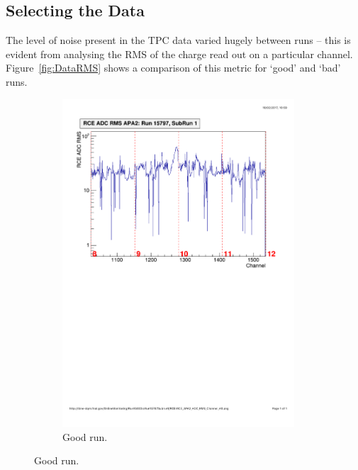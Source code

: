 \subsection{Selecting the Data}\label{sec:SelectingTheData}

The level of noise present in the TPC data varied hugely between runs -- this is evident from analysing the RMS of the charge read out on a particular channel.  Figure~\ref{fig:DataRMS} shows a comparison of this metric for `good' and `bad' runs.

\begin{figure}
  \centering
  \begin{subfigure}{0.45\linewidth}
    \centering
    \includegraphics[width=0.95\textwidth]{DataRMSGood.pdf}
    \caption{Good run.}
    \label{fig:DataRMSGoodRun}

\end{subfigure}
\end{figure}

